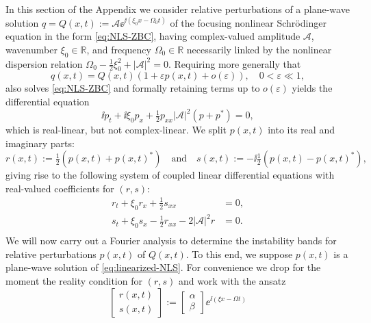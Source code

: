 In this section of the Appendix we consider relative perturbations of a plane-wave solution $q=Q(x,t):= \mathcal{A} \ee^{\ii (\xi_0 x - \Omega_0 t)}$ of the focusing nonlinear Schr\"odinger equation in the form \eqref{eq:NLS-ZBC}, 
having complex-valued amplitude $\mathcal{A}$, wavenumber $\xi_0\in\mathbb{R}$, and frequency $\Omega_0\in\mathbb{R}$ necessarily linked by the nonlinear dispersion relation $\Omega_0 -\tfrac{1}{2}\xi_0^2 + |\mathcal{A}|^2=0$. Requiring more generally that 
\begin{equation}
q(x,t) = Q(x,t)(1 + \varepsilon p(x,t) + o(\varepsilon)),\quad 0< \varepsilon \ll 1,
\label{eq:q-perturb-appendix}
\end{equation}
also solves \eqref{eq:NLS-ZBC} 
and formally retaining terms up to $o(\varepsilon)$ yields the differential equation
\begin{equation}
\ii p_t + \ii \xi_0 p_x + \tfrac{1}{2}p_{xx} |\mathcal{A}|^2(p + p^*) = 0,
\label{eq:linearized-NLS}
\end{equation} 
which is real-linear, but not complex-linear. We split $p(x,t)$ into its real and imaginary parts:
\begin{equation}
r(x,t) := \tfrac{1}{2}(p(x,t) + p(x,t)^*)\quad \text{and} \quad s(x,t) := -\ii\tfrac{1}{2}(p(x,t) - p(x,t)^*),
\end{equation}
giving rise to the following system of coupled linear differential equations with real-valued coefficients for $(r,s)$:
\begin{equation}
\begin{aligned}
r_t + \xi_0 r_x + \tfrac{1}{2} s_{xx} &=0,\\
s_t + \xi_0 s_x - \tfrac{1}{2} r_{xx} - 2 |\mathcal{A}|^2 r &=0.\\
\end{aligned}
\label{eq:linearized-NLS-r-s}
\end{equation}
We will now carry out a Fourier analysis to determine the instability bands for relative perturbations $p(x,t)$ of $Q(x,t)$. To this end, we suppose $p(x,t)$ is a plane-wave solution of \eqref{eq:linearized-NLS}. For convenience we drop for the moment the reality condition for $(r,s)$ and work with the ansatz
\begin{equation}
\begin{bmatrix}
r(x,t) \\ s(x,t)
\end{bmatrix}
:= \begin{bmatrix}
\alpha \\ \beta
\end{bmatrix}\ee^{\ii (\xi x - \Omega t)}
\label{eq:r-s-ansatz}
\end{equation}
